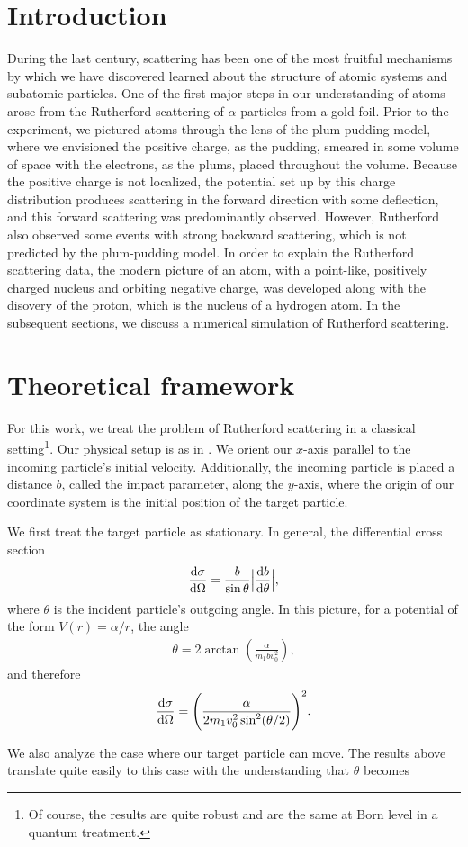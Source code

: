 
\def\HWnum{Project 2}
\def\duedate{October 27, 2024}




\section{Introduction}

During the last century, scattering has been one of the most fruitful mechanisms by which we have discovered learned about the structure of atomic systems and subatomic particles.
One of the first major steps in our understanding of atoms arose from the Rutherford scattering of $\alpha$-particles from a gold foil.
Prior to the experiment, we pictured atoms through the lens of the plum-pudding model, where we envisioned the positive charge, as the pudding, smeared in some volume of space with the electrons, as the plums, placed throughout the volume.
Because the positive charge is not localized, the potential set up by this charge distribution produces scattering in the forward direction with some deflection, and this forward scattering was predominantly observed.
However, Rutherford also observed some events with strong backward scattering, which is not predicted by the plum-pudding model.
In order to explain the Rutherford scattering data, the modern picture of an atom, with a point-like, positively charged nucleus and orbiting negative charge, was developed along with the disovery of the proton, which is the nucleus of a hydrogen atom.
In the subsequent sections, we discuss a numerical simulation of Rutherford scattering.

\section{Theoretical framework}

For this work, we treat the problem of Rutherford scattering in a classical setting\footnote{Of course, the results are quite robust and are the same at Born level in a quantum treatment.}.
Our physical setup is as in .
We orient our $x$-axis parallel to the incoming particle's initial velocity.
Additionally, the incoming particle is placed a distance $b$, called the impact parameter, along the $y$-axis, where the origin of our coordinate system is the initial position of the target particle.

We first treat the target particle as stationary.
In general, the differential cross section
\begin{align}
    \dv{\sigma}{\Omega} = \frac{b}{\sin{\theta}} \Big| \dv{b}{\theta} \Big|
,\end{align}
where $\theta$ is the incident particle's outgoing angle.
In this picture, for a potential of the form $V(r) = \alpha / r$, the angle
\begin{align}
    \theta = 2 \arctan(\frac{\alpha}{m_1 b v_0^2})
,\end{align}
and therefore
\begin{align}
    \dv{\sigma}{\Omega} = \Bigg( \frac{\alpha}{2 m_1 v_0^2 \sin^2(\theta/2)} \Bigg)^2
.\end{align}

We also analyze the case where our target particle can move.
The results above translate quite easily to this case with the understanding that $\theta$ becomes 



    

